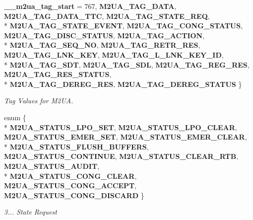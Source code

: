 \begin{DoxyCompactItemize}
{\bf \+\_\+\+\_\+m2ua\+\_\+tag\+\_\+start} = 767, 
{\bf M2\+U\+A\+\_\+\+T\+A\+G\+\_\+\+D\+A\+TA}, 
{\bf M2\+U\+A\+\_\+\+T\+A\+G\+\_\+\+D\+A\+T\+A\+\_\+\+T\+TC}, 
{\bf M2\+U\+A\+\_\+\+T\+A\+G\+\_\+\+S\+T\+A\+T\+E\+\_\+\+R\+EQ}, 
\\*
{\bf M2\+U\+A\+\_\+\+T\+A\+G\+\_\+\+S\+T\+A\+T\+E\+\_\+\+E\+V\+E\+NT}, 
{\bf M2\+U\+A\+\_\+\+T\+A\+G\+\_\+\+C\+O\+N\+G\+\_\+\+S\+T\+A\+T\+US}, 
{\bf M2\+U\+A\+\_\+\+T\+A\+G\+\_\+\+D\+I\+S\+C\+\_\+\+S\+T\+A\+T\+US}, 
{\bf M2\+U\+A\+\_\+\+T\+A\+G\+\_\+\+A\+C\+T\+I\+ON}, 
\\*
{\bf M2\+U\+A\+\_\+\+T\+A\+G\+\_\+\+S\+E\+Q\+\_\+\+NO}, 
{\bf M2\+U\+A\+\_\+\+T\+A\+G\+\_\+\+R\+E\+T\+R\+\_\+\+R\+ES}, 
{\bf M2\+U\+A\+\_\+\+T\+A\+G\+\_\+\+L\+N\+K\+\_\+\+K\+EY}, 
{\bf M2\+U\+A\+\_\+\+T\+A\+G\+\_\+\+L\+\_\+\+L\+N\+K\+\_\+\+K\+E\+Y\+\_\+\+ID}, 
\\*
{\bf M2\+U\+A\+\_\+\+T\+A\+G\+\_\+\+S\+DT}, 
{\bf M2\+U\+A\+\_\+\+T\+A\+G\+\_\+\+S\+DL}, 
{\bf M2\+U\+A\+\_\+\+T\+A\+G\+\_\+\+R\+E\+G\+\_\+\+R\+ES}, 
{\bf M2\+U\+A\+\_\+\+T\+A\+G\+\_\+\+R\+E\+S\+\_\+\+S\+T\+A\+T\+US}, 
\\*
{\bf M2\+U\+A\+\_\+\+T\+A\+G\+\_\+\+D\+E\+R\+E\+G\+\_\+\+R\+ES}, 
{\bf M2\+U\+A\+\_\+\+T\+A\+G\+\_\+\+D\+E\+R\+E\+G\+\_\+\+S\+T\+A\+T\+US}
 \}\begin{DoxyCompactList}\small\item\em Tag Values for M2\+UA. \end{DoxyCompactList}
\item 
enum \{ \\*
{\bf M2\+U\+A\+\_\+\+S\+T\+A\+T\+U\+S\+\_\+\+L\+P\+O\+\_\+\+S\+ET}, 
{\bf M2\+U\+A\+\_\+\+S\+T\+A\+T\+U\+S\+\_\+\+L\+P\+O\+\_\+\+C\+L\+E\+AR}, 
{\bf M2\+U\+A\+\_\+\+S\+T\+A\+T\+U\+S\+\_\+\+E\+M\+E\+R\+\_\+\+S\+ET}, 
{\bf M2\+U\+A\+\_\+\+S\+T\+A\+T\+U\+S\+\_\+\+E\+M\+E\+R\+\_\+\+C\+L\+E\+AR}, 
\\*
{\bf M2\+U\+A\+\_\+\+S\+T\+A\+T\+U\+S\+\_\+\+F\+L\+U\+S\+H\+\_\+\+B\+U\+F\+F\+E\+RS}, 
{\bf M2\+U\+A\+\_\+\+S\+T\+A\+T\+U\+S\+\_\+\+C\+O\+N\+T\+I\+N\+UE}, 
{\bf M2\+U\+A\+\_\+\+S\+T\+A\+T\+U\+S\+\_\+\+C\+L\+E\+A\+R\+\_\+\+R\+TB}, 
{\bf M2\+U\+A\+\_\+\+S\+T\+A\+T\+U\+S\+\_\+\+A\+U\+D\+IT}, 
\\*
{\bf M2\+U\+A\+\_\+\+S\+T\+A\+T\+U\+S\+\_\+\+C\+O\+N\+G\+\_\+\+C\+L\+E\+AR}, 
{\bf M2\+U\+A\+\_\+\+S\+T\+A\+T\+U\+S\+\_\+\+C\+O\+N\+G\+\_\+\+A\+C\+C\+E\+PT}, 
{\bf M2\+U\+A\+\_\+\+S\+T\+A\+T\+U\+S\+\_\+\+C\+O\+N\+G\+\_\+\+D\+I\+S\+C\+A\+RD}
 \}\begin{DoxyCompactList}\small\item\em 3... State Request \end{DoxyCompactList}

\end{DoxyCompactItemize}
